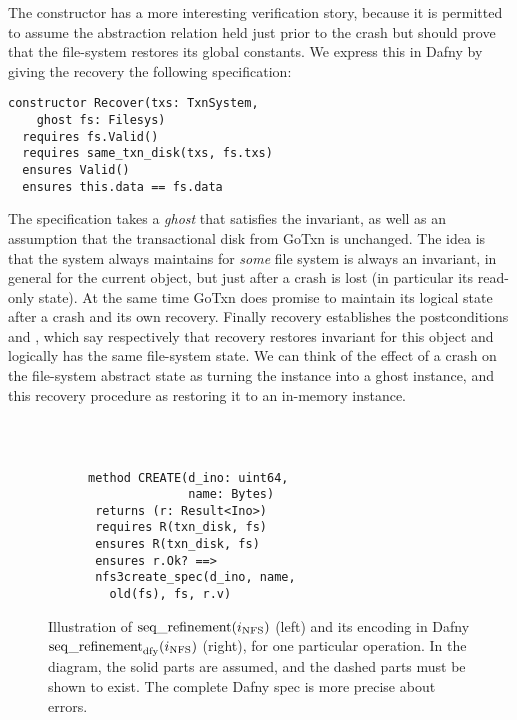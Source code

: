 The  constructor has a more interesting verification story, because
it is permitted to assume the abstraction relation held just prior to the crash
but should prove that the file-system restores its global constants. We express
this in Dafny by giving the recovery the following specification:

\begin{verbatim}
constructor Recover(txs: TxnSystem,
    ghost fs: Filesys)
  requires fs.Valid()
  requires same_txn_disk(txs, fs.txs)
  ensures Valid()
  ensures this.data == fs.data
\end{verbatim}

The specification takes a \emph{ghost}  that satisfies the invariant, as
well as an assumption that the transactional disk from GoTxn is unchanged. The
idea is that the system always maintains  for \emph{some} file
system is always an invariant, in general for the current  object, but
just after a crash  is lost (in particular its read-only state). At the
same time GoTxn does promise to maintain its logical state after a crash and its
own recovery. Finally recovery establishes the postconditions  and
, which say respectively that recovery restores
invariant for this  object and logically has the same file-system
state. We can think of the effect of a crash on the file-system abstract state
as turning the  instance into a ghost instance, and this recovery
procedure as restoring it to an in-memory instance.

\begin{figure}
  \centering
  \begin{subfigure}{0.25\textwidth}
    
  \end{subfigure}~~~\vrule~~~~%
\begin{subfigure}{0.3\textwidth}
  {\small
\begin{verbatim}

method CREATE(d_ino: uint64,
              name: Bytes)
 returns (r: Result<Ino>)
 requires R(txn_disk, fs)
 ensures R(txn_disk, fs)
 ensures r.Ok? ==>
 nfs3create_spec(d_ino, name,
   old(fs), fs, r.v)
\end{verbatim}
}
\end{subfigure}
\vspace{0.5\baselineskip}
  \caption[Illustration of sequential refinement and its Dafny encoding]%
  {Illustration of $\operatorname{seq\_refinement}(i_{\mathrm{NFS}})$ (left) and its encoding
in Dafny $\operatorname{seq\_refinement}_{\mathrm{dfy}}(i_{\mathrm{NFS}})$ (right), for one particular operation.
In the diagram, the solid parts are assumed, and the
dashed parts must be shown to exist. The complete Dafny spec is more precise about
errors.}
  \label{fig:refinement}
\end{figure}

